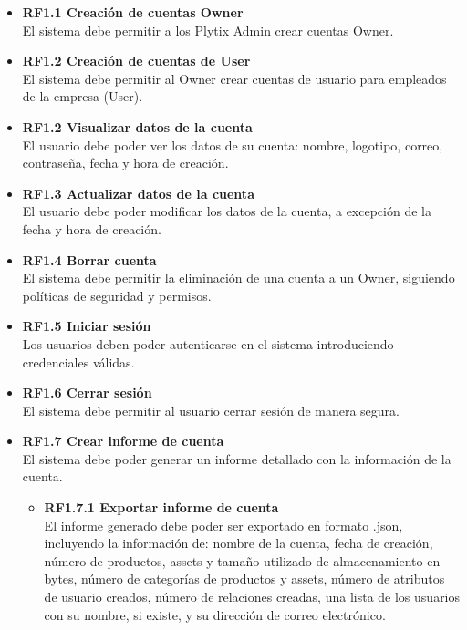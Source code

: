 \documentclass[12pt.a4paper]{article}
\begin{document}
\begin{itemize}
    \item \textbf{RF1.1 Creación de cuentas Owner} \\
    El sistema debe permitir a los Plytix Admin crear cuentas Owner.
    
    \item \textbf{RF1.2 Creación de cuentas de User} \\
    El sistema debe permitir al Owner crear cuentas de usuario para empleados de la empresa (User).

    \item \textbf{RF1.2 Visualizar datos de la cuenta} \\
    El usuario debe poder ver los datos de su cuenta: nombre, logotipo, correo, contraseña, fecha y hora de creación.

    \item \textbf{RF1.3 Actualizar datos de la cuenta} \\
    El usuario debe poder modificar los datos de la cuenta, a excepción de la fecha y hora de creación.

    \item \textbf{RF1.4 Borrar cuenta} \\
    El sistema debe permitir la eliminación de una cuenta a un Owner, siguiendo políticas de seguridad y permisos.

    \item \textbf{RF1.5 Iniciar sesión} \\
    Los usuarios deben poder autenticarse en el sistema introduciendo credenciales válidas.

    \item \textbf{RF1.6 Cerrar sesión} \\
    El sistema debe permitir al usuario cerrar sesión de manera segura.

    \item \textbf{RF1.7 Crear informe de cuenta} \\
    El sistema debe poder generar un informe detallado con la información de la cuenta.
    \begin{itemize}
        \item \textbf{RF1.7.1 Exportar informe de cuenta} \\
        El informe generado debe poder ser exportado en formato .json, incluyendo la información  de: nombre de la cuenta, fecha de creación, número de productos, assets y tamaño utilizado de almacenamiento en bytes, número de categorías de productos y assets, número de atributos de usuario creados, número de relaciones creadas, una lista de los usuarios con su nombre, si existe, y su dirección de correo electrónico.
    \end{itemize}



\end{itemize}
\end{document}
